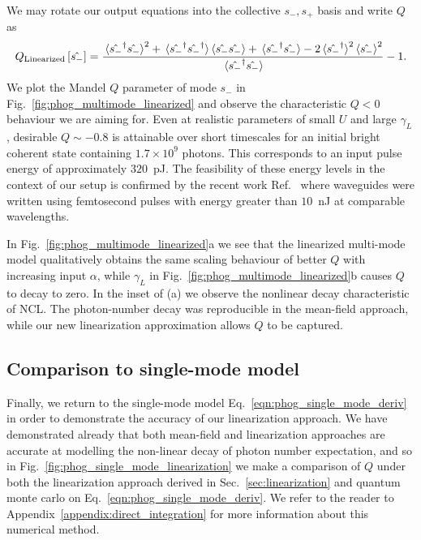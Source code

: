 We may rotate our output equations into the collective $s_-, s_+$ basis and write $Q$ as 
\begin{equation}
Q_{\text{Linearized}}\left[\hat{s_-}\right] = \frac{\ev*{\hat{s_-}^\dagger \hat{s_-}}^2 + \ev*{\hat{s_-}^\dagger\hat{s_-}^\dagger} \ev{\hat{s_-}\hat{s_-}} + \ev*{\hat{s_-}^\dagger \hat{s_-}} - 2 \ev*{\hat{s_-}^\dagger}^2 \ev{\hat{s_-}}^2}{\ev*{\hat{s_-}^\dagger \hat{s_-}}} - 1.
\end{equation}
We plot the Mandel $Q$ parameter of mode $s_-$ in Fig.~\ref{fig:phog_multimode_linearized} and observe the characteristic $Q<0$ behaviour we are aiming for. Even at realistic parameters of small $U$ and large $\gamma_L$, desirable $Q \sim -0.8$ is attainable over short timescales for an initial bright coherent state containing $1.7\times 10^9$ photons. This corresponds to an input pulse energy of approximately $320$~pJ. The feasibility of these energy levels in the context of our setup is confirmed by the recent work Ref.~\cite{Butcher2018} where waveguides were written using femtosecond pulses with energy greater than $10$~nJ at comparable wavelengths.

In Fig.~\ref{fig:phog_multimode_linearized}a we see that the linearized multi-mode model qualitatively obtains the same scaling behaviour of better $Q$ with increasing input $\alpha$, while $\gamma_L$ in Fig.~\ref{fig:phog_multimode_linearized}b causes $Q$ to decay to zero. In the inset of (a) we observe the nonlinear decay characteristic of NCL. The photon-number decay was reproducible in the mean-field approach, while our new linearization approximation allows $Q$ to be captured.



\subsection{Comparison to single-mode model}
Finally, we return to the single-mode model Eq.~\ref{eqn:phog_single_mode_deriv} in order to demonstrate the accuracy of our linearization approach. We have demonstrated already that both mean-field and linearization approaches are accurate at modelling the non-linear decay of photon number expectation, and so in Fig.~\ref{fig:phog_single_mode_linearization} we make a comparison of $Q$ under both the linearization approach derived in Sec.~\ref{sec:linearization} and quantum monte carlo on Eq.~\ref{eqn:phog_single_mode_deriv}. We refer to the reader to Appendix~\ref{appendix:direct_integration} for more information about this numerical method.

